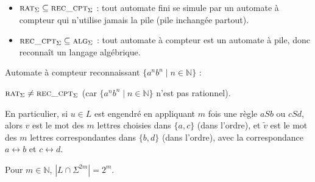 \begin{corrections}

  \begin{questions}

  \item
    \begin{itemize}
    \item $\textsc{rat}_\Sigma \subseteq \textsc{rec\_cpt}_\Sigma$ : tout automate fini se simule par un automate à compteur qui n'utilise jamais la pile (pile inchangée partout).
    \item $\textsc{rec\_cpt}_\Sigma \subseteq \textsc{alg}_\Sigma$ : tout automate à compteur est un automate à pile, donc reconnaît un langage algébrique.
    \end{itemize}

  \item Automate à compteur reconnaissant $\{a^n b^n \mid n\in\mathbb{N}\}$ :

  \item $\textsc{rat}_\Sigma \neq \textsc{rec\_cpt}_\Sigma$ (car $\{a^n b^n \mid n\in\mathbb{N}\}$ n'est pas rationnel).

  \end{questions}

  \begin{questions}

  \item En particulier, si $u\in L$ est engendré en appliquant $m$ fois une règle $aSb$ ou $cSd$,
    alors $v$ est le mot des $m$ lettres choisies dans $\{a,c\}$ (dans l'ordre), et $\tilde v$ est le mot des $m$ lettres correspondantes
    dans $\{b,d\}$ (dans l'ordre), avec la correspondance $a\leftrightarrow b$ et $c\leftrightarrow d$.

  \item Pour $m\in\mathbb{N}$, $|L\cap \Sigma^{2m}| = 2^m$.


\end{questions}
\end{corrections}
